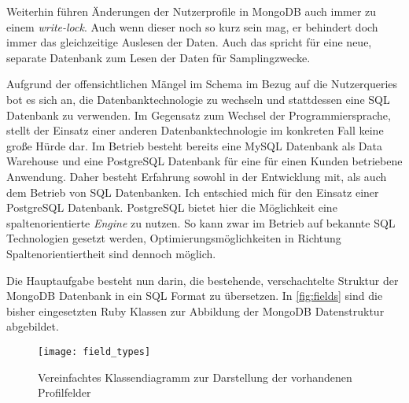 Weiterhin führen Änderungen der Nutzerprofile in MongoDB auch immer zu einem \textit{write-lock}. Auch wenn dieser noch so kurz sein mag, er behindert doch immer das gleichzeitige Auslesen der Daten. Auch das spricht für eine neue, separate Datenbank zum Lesen der Daten für Samplingzwecke.

Aufgrund der offensichtlichen Mängel im Schema im Bezug auf die Nutzerqueries bot es sich an, die Datenbanktechnologie zu wechseln und stattdessen eine SQL Datenbank zu verwenden. Im Gegensatz zum Wechsel der Programmiersprache, stellt der Einsatz einer anderen Datenbanktechnologie im konkreten Fall keine große Hürde dar. Im Betrieb besteht bereits eine MySQL\cite{mysql} Datenbank als Data Warehouse und eine PostgreSQL\cite{postgres} Datenbank für eine für einen Kunden betriebene Anwendung. Daher besteht Erfahrung sowohl in der Entwicklung mit, als auch dem Betrieb von SQL Datenbanken.
Ich entschied mich für den Einsatz einer PostgreSQL Datenbank. PostgreSQL bietet hier die Möglichkeit eine spaltenorientierte \textit{Engine} zu nutzen\cite{postgres:column}. So kann zwar im Betrieb auf bekannte SQL Technologien gesetzt werden, Optimierungsmöglichkeiten in Richtung Spaltenorientiertheit sind dennoch möglich.

Die Hauptaufgabe besteht nun darin, die bestehende, verschachtelte Struktur der MongoDB Datenbank in ein SQL Format zu übersetzen.
In \autoref{fig:fields} sind die bisher eingesetzten Ruby Klassen zur Abbildung der MongoDB Datenstruktur abgebildet. 

\begin{figure}[!ht]
    \centering
    \caption{Vereinfachtes Klassendiagramm zur Darstellung der vorhandenen Profilfelder}
    \label{fig:fields}
    \texttt{[image: field\_types]}
\end{figure}

